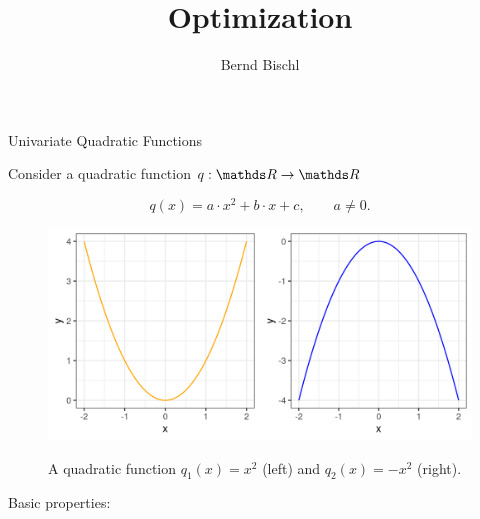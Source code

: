 





\newcommand{\titlefigure}{figure_man/quadratic_functions_2D_example_1_1.png}
\newcommand{\learninggoals}{
\item Definition of quadratic forms
\item Gradient, Hessian
\item Convexity, concavity
}



\title{Optimization}
\author{Bernd Bischl}
\date{}



\sloppy

\begin{vbframe}{Univariate Quadratic Functions}

  Consider a quadratic function $q: \R \to \R$
  
  $$
    q(x) = a \cdot x^2 + b \cdot x + c, \qquad a \ne 0.
  $$
  
  
  \begin{figure}
    \includegraphics[height=0.3\textwidth, keepaspectratio]{figure_man/quadratic_functions_1D.png} \\
    \begin{footnotesize} 
    A quadratic function $q_1(x) = x^2$ (left) and $q_2(x) = - x^2$ (right). 
    \end{footnotesize}
  \end{figure}
  
  \framebreak 
  
  Basic properties: 
  

\end{vbframe}
